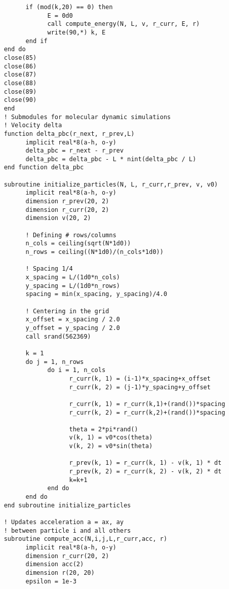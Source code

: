\begin{verbatim}
          if (mod(k,20) == 0) then
                E = 0d0
                call compute_energy(N, L, v, r_curr, E, r)
                write(90,*) k, E
          end if
    end do 
    close(85)
    close(86)
    close(87)
    close(88)
    close(89)
    close(90)
    end
    ! Submodules for molecular dynamic simulations
    ! Velocity delta 
    function delta_pbc(r_next, r_prev,L)
          implicit real*8(a-h, o-y)
          delta_pbc = r_next - r_prev
          delta_pbc = delta_pbc - L * nint(delta_pbc / L)
    end function delta_pbc

    subroutine initialize_particles(N, L, r_curr,r_prev, v, v0)
          implicit real*8(a-h, o-y)
          dimension r_prev(20, 2)
          dimension r_curr(20, 2)
          dimension v(20, 2)
         
          ! Defining # rows/columns 
          n_cols = ceiling(sqrt(N*1d0))
          n_rows = ceiling((N*1d0)/(n_cols*1d0)) 
          
          ! Spacing 1/4 
          x_spacing = L/(1d0*n_cols)
          y_spacing = L/(1d0*n_rows)
          spacing = min(x_spacing, y_spacing)/4.0 
          
          ! Centering in the grid
          x_offset = x_spacing / 2.0 
          y_offset = y_spacing / 2.0
          call srand(562369)

          k = 1 
          do j = 1, n_rows 
                do i = 1, n_cols 
                      r_curr(k, 1) = (i-1)*x_spacing+x_offset
                      r_curr(k, 2) = (j-1)*y_spacing+y_offset
                      
                      r_curr(k, 1) = r_curr(k,1)+(rand())*spacing
                      r_curr(k, 2) = r_curr(k,2)+(rand())*spacing

                      theta = 2*pi*rand()
                      v(k, 1) = v0*cos(theta)
                      v(k, 2) = v0*sin(theta)
                      
                      r_prev(k, 1) = r_curr(k, 1) - v(k, 1) * dt 
                      r_prev(k, 2) = r_curr(k, 2) - v(k, 2) * dt 
                      k=k+1
                end do 
          end do
    end subroutine initialize_particles

    ! Updates acceleration a = ax, ay 
    ! between particle i and all others
    subroutine compute_acc(N,i,j,L,r_curr,acc, r)
          implicit real*8(a-h, o-y)
          dimension r_curr(20, 2)
          dimension acc(2)
          dimension r(20, 20)
          epsilon = 1e-3


\end{verbatim}
